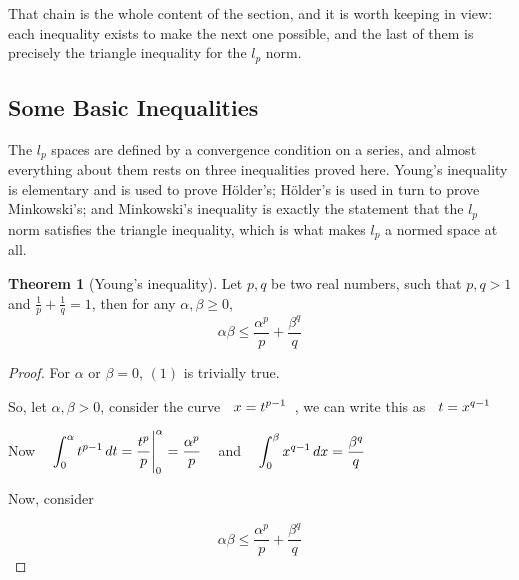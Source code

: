 \documentclass[11pt,a4paper]{article}
\theoremstyle{definition}
\newtheorem{thm}{Theorem}[section]
\begin{document}
That chain is the whole content of the section, and it is worth keeping in view:
each inequality exists to make the next one possible, and the last of them is
precisely the triangle inequality for the $l_p$ norm.

\subsection{Some Basic Inequalities}
The $l_p$ spaces are defined by a convergence condition on a series, and almost
everything about them rests on three inequalities proved here. Young's
inequality is elementary and is used to prove H\"older's; H\"older's is used in
turn to prove Minkowski's; and Minkowski's inequality is exactly the statement
that the $l_p$ norm satisfies the triangle inequality, which is what makes
$l_p$ a normed space at all.

\begin{thm}[Young's inequality]
Let $p,q$ be two real numbers, such that $p,q>1$ and $\frac{1}{p}+\frac{1}{q}=1$, then for any $\alpha, \beta \geq 0$, \begin{equation}\alpha \beta \leq \frac{\alpha^p}{p}+\frac{\beta^q}{q}\tag{1}\end{equation}
\end{thm}

\begin{proof}
For $\alpha$ or $\beta=0$, $(1)$ is trivially true.


So, let $\alpha, \beta >0$, consider the curve $\hspace{0.2cm}\displaystyle{x=t^{p-1}}\hspace{0.2cm}$, we can write this as $\hspace{0.2cm}\displaystyle{t=x^{q-1}}\hspace{0.2cm}$


Now $\hspace{0.3cm}\displaystyle{\int^{\alpha}_0 t^{p-1}\,dt=\frac{t^p}{p}\Bigg|^{\alpha}_0=\frac{\alpha^p}{p}}\hspace{0.3cm}$ and $\hspace{0.3cm}\displaystyle{\int^{\beta}_0 x^{q-1}\,dx=\frac{\beta^q}{q}}$


Now, consider


\begin{figure}[H]
\centering
{}
\end{figure}


$$\alpha \beta \leq \frac{\alpha^p}{p}+\frac{\beta^q}{q}$$


\end{proof}
\end{document}
